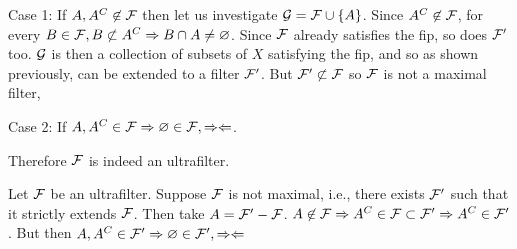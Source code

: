 \documentclass[a4paper, 10pt]{article}
\begin{document}
\begin{solution}
    Case 1: If $A, A^C \not \in \mathcal{F}$ then let us investigate $\mathcal{G} = \mathcal{F} \cup \{A\}$. Since $A^C \not \in \mathcal{F}$, for every $B \in \mathcal{F}, B \not \subset A^C \Rightarrow B \cap A \neq \varnothing$. Since $\mathcal{F}$ already satisfies the fip, so does $\mathcal{F}'$ too. $\mathcal{G}$ is then a collection of subsets of $X$ satisfying the fip, and so as shown previously, can be extended to a filter $\mathcal{F}'$. But $\mathcal{F}' \not \subset \mathcal{F}$ so $\mathcal{F}$ is not a maximal filter, \contra

    Case 2: If $A, A^C \in \mathcal{F} \Rightarrow \varnothing \in \mathcal{F}, \Rightarrow\Leftarrow$.

    Therefore $\mathcal{F}$ is indeed an ultrafilter.

    \pfbwd Let $\mathcal{F}$ be an ultrafilter. Suppose $\mathcal{F}$ is not maximal, i.e., there exists $\mathcal{F}'$ such that it strictly extends $\mathcal{F}$. Then take $A = \mathcal{F}' - \mathcal{F}$. $A \not \in \mathcal{F} \Rightarrow A^C \in \mathcal{F} \subset \mathcal{F}' \Rightarrow A^C \in \mathcal{F}'$. But then $A, A^C \in \mathcal{F}' \Rightarrow \varnothing \in \mathcal{F}', \Rightarrow\Leftarrow$
\end{solution}
\end{document}
